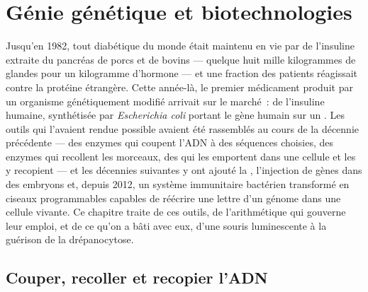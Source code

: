 \chapter{Génie génétique et biotechnologies}\label{ch:b3:genetic-engineering}

Jusqu'en 1982, tout diabétique du monde était maintenu en vie par de
l'insuline extraite du pancréas de porcs et de bovins --- quelque huit
mille kilogrammes de glandes pour un kilogramme d'hormone --- et une
fraction des patients réagissait contre la protéine étrangère. Cette
année-là, le premier médicament produit par un organisme génétiquement
modifié arrivait sur le marché~: de l'insuline humaine, synthétisée par
\emph{Escherichia coli} portant le gène humain sur un . Les
outils qui l'avaient rendue possible avaient été rassemblés au cours de
la décennie précédente --- des enzymes qui coupent l'ADN à des
séquences choisies, des enzymes qui recollent les morceaux, des
 qui les emportent dans une cellule et les y recopient --- et
les décennies suivantes y ont ajouté la , l'injection de gènes dans des embryons et, depuis 2012, un
système immunitaire bactérien transformé en ciseaux programmables
capables de réécrire une lettre d'un génome dans une cellule vivante.
Ce chapitre traite de ces outils, de l'arithmétique qui gouverne leur
emploi, et de ce qu'on a bâti avec eux, d'une souris luminescente à la
guérison de la drépanocytose.

\section{Couper, recoller et recopier l'ADN}

